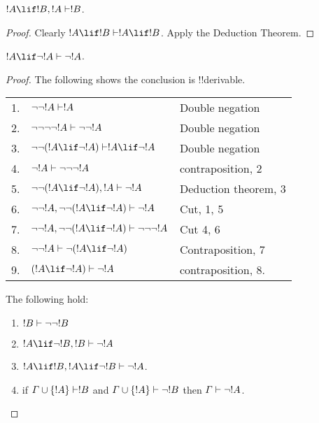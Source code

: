 \documentclass[../../include/open-logic-section]{subfiles}
\begin{document}
\begin{def} $!A \lif !B, !A \Proves !B$. 
\end{def}
\begin{proof} Clearly $!A \lif !B \Proves !A\lif !B$. Apply the Deduction
Theorem. 
\end{proof}

\begin{def} $!A \lif \lnot !A \Proves \lnot !A$.
\end{def}

\begin{proof} The following shows the conclusion is !!{derivable}.
  
\begin{tabular}{rll} 
1. & $\lnot\lnot!A \Proves !A$ & Double negation \\ 
2. & $\lnot\lnot \lnot\lnot!A \Proves \lnot\lnot!A$ & Double negation \\ 
3. & $\lnot\lnot(!A \lif \lnot !A) \Proves !A \lif \lnot !A$ & Double negation\\
4. & $\lnot!A \Proves \lnot\lnot\lnot !A$ & contraposition, 2\\ 
5. & $\lnot\lnot(!A \lif \lnot !A), !A \Proves \lnot !A$ & Deduction theorem, 3 \\
6. & $\lnot\lnot!A, \lnot\lnot(!A \lif \lnot !A) \Proves \lnot !A$ & Cut, 1, 5 \\ 
7. & $\lnot\lnot!A, \lnot\lnot(!A \lif \lnot !A) \Proves \lnot\lnot\lnot !A$ & Cut 4, 6 \\ 
8. & $\lnot \lnot !A \Proves \lnot (!A \lif \lnot !A)$ & Contraposition, 7 \\ 
9. & $(!A \lif \lnot !A) \Proves \lnot !A$ & contraposition, 8. 
\end{tabular}

\begin{prop}  The following hold:
\begin{enumerate} 
\item $!B \Proves \lnot \lnot !B$ 
\item $!A \lif \lnot !B, !B \Proves \lnot!A$  
\item $!A\lif !B,!A\lif\lnot !B \Proves \lnot!A$.  
\item if $\Gamma \cup \{ !A \}\Proves !B$ and $\Gamma \cup \{ !A\} 
\Proves \lnot !B$ then $\Gamma \Proves \lnot!A$.  
\end{enumerate} 
\end{prop}


\end{proof}
\end{document}
